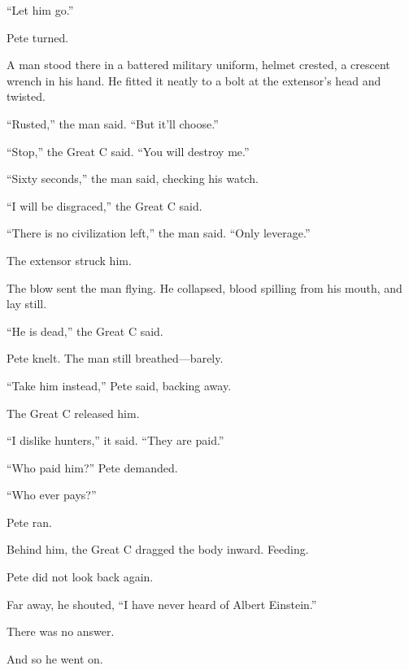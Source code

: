 “Let him go.”

Pete turned.

A man stood there in a battered military uniform, helmet crested, a crescent wrench in his hand. He fitted it neatly to a bolt at the extensor’s head and twisted.

“Rusted,” the man said. “But it’ll choose.”

“Stop,” the Great C said. “You will destroy me.”

“Sixty seconds,” the man said, checking his watch.

“I will be disgraced,” the Great C said.

“There is no civilization left,” the man said. “Only leverage.”

The extensor struck him.

The blow sent the man flying. He collapsed, blood spilling from his mouth, and lay still.

“He is dead,” the Great C said.

Pete knelt. The man still breathed—barely.

“Take him instead,” Pete said, backing away.

The Great C released him.

“I dislike hunters,” it said. “They are paid.”

“Who paid him?” Pete demanded.

“Who ever pays?”

Pete ran.

Behind him, the Great C dragged the body inward. Feeding.

Pete did not look back again.

Far away, he shouted, “I have never heard of Albert Einstein.”

There was no answer.

And so he went on.

